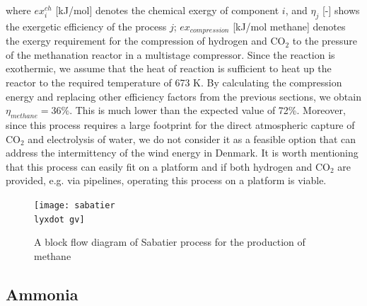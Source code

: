 \documentclass{ECOS_2021}
\begin{document}
where $ex_{i}^{ch}$ {[}kJ/mol{]} denotes the chemical exergy of component
$i$, and $\eta_{j}$ {[}-{]} shows the exergetic efficiency \cite{eftekhariExergyAnalysisUnderground2012f}
of the process $j$; $ex_{compression}$ {[}kJ/mol methane{]} denotes
the exergy requirement for the compression of hydrogen and CO$_{2}$
to the pressure of the methanation reactor in a multistage compressor.
Since the reaction is exothermic, we assume that the heat of reaction
is sufficient to heat up the reactor to the required temperature of
673 K. By calculating the compression energy and replacing other efficiency
factors from the previous sections, we obtain $\eta_{methane}=36\%$.
This is much lower than the expected value of 72\%. Moreover, since
this process requires a large footprint for the direct atmospheric
capture of CO$_{2}$ and electrolysis of water, we do not consider
it as a feasible option that can address the intermittency of the
wind energy in Denmark. It is worth mentioning that this process can
easily fit on a platform and if both hydrogen and CO$_{2}$ are provided,
e.g. via pipelines, operating this process on a platform is viable.

\begin{figure}[H]
\texttt{[image: sabatier\\lyxdot gv]}

\caption{\label{fig:methane-process}A block flow diagram of Sabatier process
for the production of methane \cite{eftekhariQuantifyingRoleLiquid2020}}
\end{figure}


\subsection{Ammonia}
\end{document}
